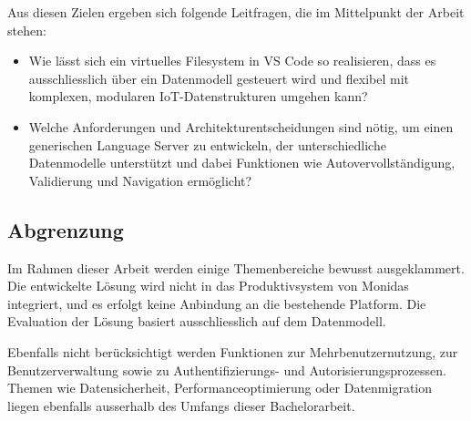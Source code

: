 Aus diesen Zielen ergeben sich folgende Leitfragen, die im Mittelpunkt der Arbeit stehen:

\begin{itemize}

\item Wie lässt sich ein virtuelles Filesystem in VS Code so realisieren, dass es ausschliesslich über ein Datenmodell gesteuert wird und flexibel mit komplexen, modularen IoT-Datenstrukturen umgehen kann?

\item Welche Anforderungen und Architekturentscheidungen sind nötig, um einen generischen Language Server zu entwickeln, der unterschiedliche Datenmodelle unterstützt und dabei Funktionen wie Autovervollständigung, Validierung und Navigation ermöglicht?

\end{itemize}


\subsection{Abgrenzung}


Im Rahmen dieser Arbeit werden einige Themenbereiche bewusst ausgeklammert. Die entwickelte Lösung wird nicht in das Produktivsystem von Monidas integriert, und es erfolgt keine Anbindung an die bestehende Platform. Die Evaluation der Lösung basiert ausschliesslich auf dem Datenmodell.

Ebenfalls nicht berücksichtigt werden Funktionen zur Mehrbenutzernutzung, zur Benutzerverwaltung sowie zu Authentifizierungs- und Autorisierungsprozessen. Themen wie Datensicherheit, Performanceoptimierung oder Datenmigration liegen ebenfalls ausserhalb des Umfangs dieser Bachelorarbeit.

